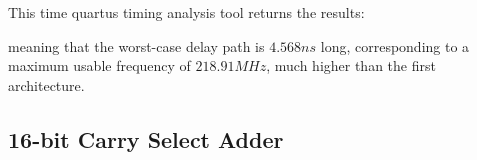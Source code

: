 \documentclass[12pt]{article}
\begin{document}
This time quartus timing analysis tool returns the results:
\begin{figure}[!h]
	\centering
	\begin{subfigure}{\linewidth}	
		\centering
	\end{subfigure}
	
\end{figure}

meaning that the worst-case delay path is $4.568 ns $ long, corresponding to a maximum usable frequency of $218.91MHz$, much higher than the first architecture.

\newpage
\subsection{16-bit Carry Select Adder}
\end{document}
